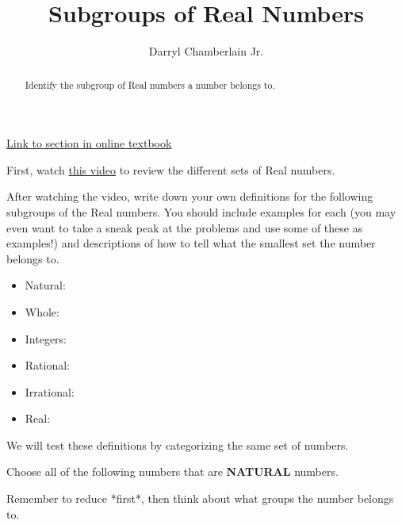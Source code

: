 \documentclass{ximera}
\author{Darryl Chamberlain Jr.}
\title{Subgroups of Real Numbers}
\begin{document}
\begin{abstract}
Identify the subgroup of Real numbers a number belongs to.
\end{abstract}
\maketitle

\href{https://cnx.org/contents/mwjClAV_@8.1:0KhpF2RH@23/Real-Numbers-Algebra-Essentials}{Link to section in online textbook}

First, watch \href{https://mediasite.video.ufl.edu/Mediasite/Play/67aa041fe31847d7be8047e131f256b71d}{this video} to review the different sets of Real numbers. %

After watching the video, write down your own definitions for the following subgroups of the Real numbers. You should include examples for each (you may even want to take a sneak peak at the problems and use some of these as examples!) and descriptions of how to tell what the smallest set the number belongs to.

\begin{itemize}
\item Natural:
\item Whole:
\item Integers:
\item Rational:
\item Irrational:
\item Real:
\end{itemize}

We will test these definitions by categorizing the same set of numbers.

\begin{exercise}
Choose all of the following numbers that are \textbf{NATURAL} numbers.
  \begin{selectAll}
  \end{selectAll}

\begin{hint}
	Remember to reduce *first*, then think about what groups the number belongs to.
\end{hint}
\end{exercise}
\end{document}
